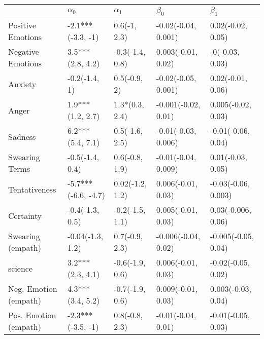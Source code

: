 \begin{tabular}{lllll}
\toprule
{} &           $\alpha_0$ &       $\alpha_1$ &            $\beta_0$ &            $\beta_1$ \\
\midrule
Positive Emotions     &    -2.1***(-3.3, -1) &     0.6(-1, 2.3) &  -0.02(-0.04, 0.001) &    0.02(-0.02, 0.05) \\
Negative Emotions     &     3.5***(2.8, 4.2) &  -0.3(-1.4, 0.8) &   0.003(-0.01, 0.02) &      -0(-0.03, 0.03) \\
Anxiety               &        -0.2(-1.4, 1) &     0.5(-0.9, 2) &  -0.02(-0.05, 0.001) &    0.02(-0.01, 0.06) \\
Anger                 &     1.9***(1.2, 2.7) &   1.3*(0.3, 2.4) &  -0.001(-0.02, 0.01) &   0.005(-0.02, 0.03) \\
Sadness               &     6.2***(5.4, 7.1) &   0.5(-1.6, 2.5) &  -0.01(-0.03, 0.006) &   -0.01(-0.06, 0.04) \\
Swearing Terms        &      -0.5(-1.4, 0.4) &   0.6(-0.8, 1.9) &  -0.01(-0.04, 0.009) &    0.01(-0.03, 0.05) \\
Tentativeness         &  -5.7***(-6.6, -4.7) &  0.02(-1.2, 1.2) &   0.006(-0.01, 0.03) &  -0.03(-0.06, 0.003) \\
Certainty             &      -0.4(-1.3, 0.5) &  -0.2(-1.5, 1.1) &   0.005(-0.01, 0.03) &   0.03(-0.006, 0.06) \\
Swearing (empath)     &     -0.04(-1.3, 1.2) &   0.7(-0.9, 2.3) &  -0.006(-0.04, 0.02) &  -0.005(-0.05, 0.04) \\
science               &     3.2***(2.3, 4.1) &  -0.6(-1.9, 0.6) &   0.006(-0.01, 0.03) &   -0.02(-0.05, 0.02) \\
Neg. Emotion (empath) &     4.3***(3.4, 5.2) &  -0.7(-1.9, 0.6) &   0.009(-0.01, 0.03) &   0.003(-0.03, 0.04) \\
Pos. Emotion (empath) &    -2.3***(-3.5, -1) &   0.8(-0.8, 2.3) &   -0.01(-0.04, 0.01) &   -0.01(-0.05, 0.03) \\
\bottomrule
\end{tabular}

